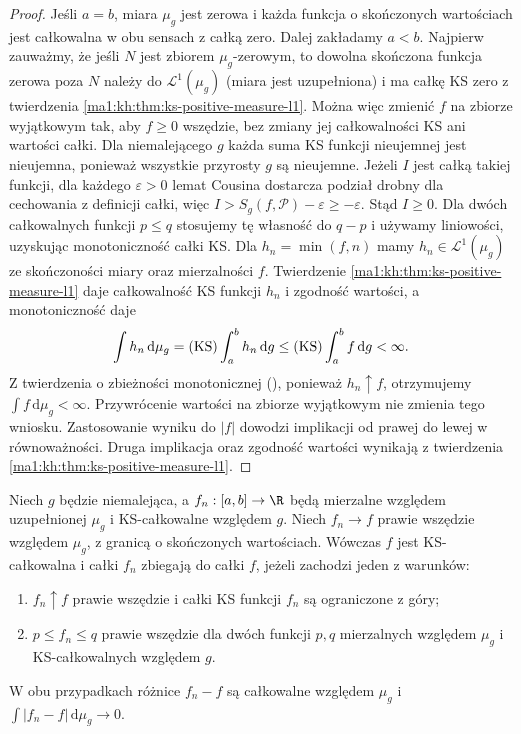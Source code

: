 \begin{proof}
Jeśli $a=b$, miara $\mu_g$ jest zerowa i każda
funkcja o skończonych wartościach jest całkowalna
w obu sensach z całką zero. Dalej zakładamy $a<b$.
Najpierw zauważmy, że jeśli $N$ jest zbiorem $\mu_g$-zerowym, to dowolna skończona funkcja zerowa poza $N$ należy do $\mathcal L^1(\mu_g)$ (miara jest uzupełniona) i ma całkę KS zero z twierdzenia \ref{ma1:kh:thm:ks-positive-measure-l1}. Można więc zmienić $f$ na zbiorze wyjątkowym tak, aby $f\ge0$ wszędzie, bez zmiany jej całkowalności KS ani wartości całki. Dla niemalejącego $g$ każda suma KS funkcji nieujemnej jest nieujemna, ponieważ wszystkie przyrosty $g$ są nieujemne. Jeżeli $I$ jest całką takiej funkcji, dla każdego
$\varepsilon>0$ lemat Cousina dostarcza podział drobny
dla cechowania z definicji całki, więc
$I>S_g(f,\mathcal P)-\varepsilon\ge-\varepsilon$.
Stąd $I\ge0$. Dla dwóch całkowalnych funkcji
$p\le q$ stosujemy tę własność do $q-p$ i używamy
liniowości, uzyskując monotoniczność całki KS.
Dla $h_n=\min(f,n)$ mamy $h_n\in\mathcal L^1(\mu_g)$ ze skończoności miary oraz mierzalności $f$. Twierdzenie \ref{ma1:kh:thm:ks-positive-measure-l1} daje całkowalność KS funkcji $h_n$ i zgodność wartości, a monotoniczność daje
\[
 \int h_n\,\mathrm d\mu_g=(\mathrm{KS})\int_a^b h_n\,\mathrm dg
 \le(\mathrm{KS})\int_a^b f\,\mathrm dg<\infty.
\]
Z twierdzenia o zbieżności monotonicznej
(),
ponieważ $h_n\uparrow f$, otrzymujemy $\int f\,\mathrm d\mu_g<\infty$. Przywrócenie wartości na zbiorze wyjątkowym nie zmienia tego wniosku. Zastosowanie wyniku do $|f|$ dowodzi implikacji od prawej do lewej w równoważności. Druga implikacja oraz zgodność wartości wynikają z twierdzenia \ref{ma1:kh:thm:ks-positive-measure-l1}.
\end{proof}
\begin{wniosek}\label{ma1:kh:cor:ks-order-limits-monotone}
Niech $g$ będzie niemalejąca, a $f_n:[a,b]\to\R$ będą mierzalne względem uzupełnionej $\mu_g$ i KS-całkowalne względem $g$. Niech $f_n\to f$ prawie wszędzie względem $\mu_g$, z granicą o skończonych wartościach. Wówczas $f$ jest KS-całkowalna i całki $f_n$ zbiegają do całki $f$, jeżeli zachodzi jeden z warunków:
\begin{enumerate}[label=(\alph*)]
\item $f_n\uparrow f$ prawie wszędzie i całki KS funkcji $f_n$ są ograniczone z góry;
\item $p\le f_n\le q$ prawie wszędzie dla dwóch funkcji $p,q$ mierzalnych względem $\mu_g$ i KS-całkowalnych względem $g$.
\end{enumerate}
W obu przypadkach różnice $f_n-f$ są całkowalne względem $\mu_g$ i $\int|f_n-f|\,\mathrm d\mu_g\to0$.
\end{wniosek}
